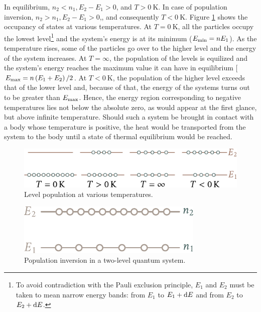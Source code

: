 In equilibrium, $n_2<n_1, E_2-E_1>0$, and $T>\SI{0}{\kelvin}$. In case of population inversion, $n_2>n_1, E_2-E_1>0$,, and consequently $T<\SI{0}{\kelvin}$. Figure \ref{fig:7_26} shows the occupancy of states at various temperatures.
At $T=\SI{0}{\kelvin}$, all the particles occupy the lowest level\footnote{To avoid contradiction with the Pauli exclusion principle, $E_1$ and $E_2$ must be taken to mean narrow energy bands: from $E_1$ to $E_1+\mathrm{d} E$ and from $E_2$ to $E_2+\mathrm{d} E$.} and the system's energy is at its minimum ($E_{\text{min}}=nE_1$). As the temperature rises, some of the particles go over to the higher level and the energy of the system increases.
At $T=\infty$, the population of the levels is equilized and the system's energy reaches the maximum value it can have in equilibrium [$E_{\text{max}}=n\left(E_1+E_2\right)/2$.
At $T<\SI{0}{\kelvin}$, the population of the higher level exceeds that of the lower level and, because of that, the energy of the systems turns out to be greater than $E_{\text{max}}$. Hence, the energy region corresponding to negative temperatures lies not below the absolute zero, as would appear at the first glance, but above infinite temperature. Should such a system be brought in contact with a body whose temperature
is positive, the heat would be transported from the system to the body until a state of thermal equilibrium would be reached.

\begin{figure}[t]
	\begin{center}
		\includegraphics[scale=1]{figures/ch_07/fig_7_26.pdf}
		\caption[]{Level population at various temperatures.}
		\label{fig:7_26}
	\end{center}
	\vspace{-0.5cm}
\end{figure}

\begin{figure}[t]
	\begin{center}
		\includegraphics[scale=1]{figures/ch_07/fig_7_27.pdf}
		\caption[]{Population inversion in a two-level quantum system.}
		\label{fig:7_27}
	\end{center}
	\vspace{-0.8cm}
\end{figure}

